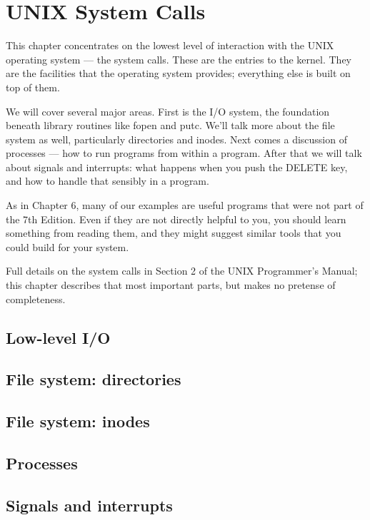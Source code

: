 \chapter{UNIX System Calls}
This chapter concentrates on the lowest level of interaction with the UNIX
operating system --- the system calls. These are the entries to the kernel. They
are the facilities that the operating system provides; everything else is built
on top of them.

We will cover several major areas. First is the I/O system, the foundation
beneath library routines like fopen and putc. We'll talk more about the file
system as well, particularly directories and inodes. Next comes a discussion of
processes --- how to run programs from within a program. After that we will talk
about signals and interrupts: what happens when you push the DELETE key, and how
to handle that sensibly in a program.

As in Chapter 6, many of our examples are useful programs that were not part of
the 7th Edition. Even if they are not directly helpful to you, you should learn
something from reading them, and they might suggest similar tools that you could
build for your system.

Full details on the system calls in Section 2 of the UNIX Programmer's Manual;
this chapter describes that most important parts, but makes no pretense of
completeness.
\section{Low-level I/O}
\section{File system: directories}
\section{File system: inodes}
\section{Processes}
\section{Signals and interrupts}
